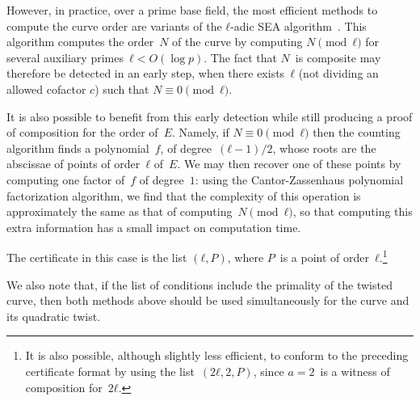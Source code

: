\documentclass[twocolumn,letterpaper,10pt]{article}
\begin{document}
\smallskip

However, in practice, over a prime base field,
the most efficient methods to compute the curve order are
variants of the $ℓ$-adic SEA algorithm~\cite{mc1985schoof,
jtnb1995schoof,smf2008cl}.
This algorithm computes the order~$N$ of the curve
by computing $N \pmod{ℓ}$ for several
auxiliary primes~$ℓ < O(\log p)$.
The fact that $N$~is composite may therefore be detected
in an early step,
when there exists~$ℓ$ (not dividing an allowed cofactor $c$)
such that $N ≡ 0 \pmod{ℓ}$.

It is also possible to benefit from this early detection
while still producing a proof of composition for the order of~$E$.
Namely, if $N ≡ 0 \pmod{ℓ}$ then
the counting algorithm finds a polynomial~$f$, of degree~$(ℓ-1)/2$,
whose roots are the abscissae of points of order~$ℓ$ of~$E$.
We may then recover one of these points by
computing one factor of~$f$ of degree~$1$:
using the Cantor-Zassenhaus polynomial factorization algorithm,
we find that the complexity of this operation
is approximately the same as that of computing~$N \pmod{ℓ}$,
so that computing this extra information
has a small impact on computation time.

The certificate in this case is the list $(ℓ, P)$,
where $P$~is a point of order~$ℓ$.\footnote{%
It is also possible, although slightly less efficient,
to conform to the preceding certificate format
by using the list~$(2 ℓ, 2, P)$,
since $a = 2$~is a witness of composition for~$2ℓ$.}

We also note that, if the list of conditions
include the primality of the twisted curve,
then both methods above should be used
simultaneously for the curve and its quadratic twist.
% 
% 
% 
\end{document}
